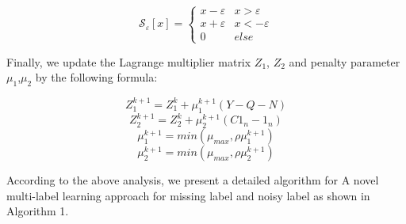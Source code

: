 \documentclass[final,3p,times]{elsarticle}
\begin{document}
\begin{equation}
	\mathcal{S}_{\varepsilon}[x]=
	\begin{cases}
		x-\varepsilon &  x>\varepsilon\\
		x+\varepsilon &  x<-\varepsilon\\
		0 & else
	\end{cases}
\end{equation}


Finally, we update the Lagrange multiplier matrix $Z_1$, $Z_2$ and penalty parameter $\mu_{1}$,$\mu_{2}$ by the following formula:

$$ Z_1^{k+1}=Z_1^{k}+\mu_{1}^{k+1}(Y-Q-N)$$
$$ Z_2^{k+1}=Z_2^{k}+\mu_{2}^{k+1}(C1_n-1_n)$$
$$ \mu_1^{k+1}=min(\mu_{max},\rho\mu_{1}^{k+1})$$
$$ \mu_2^{k+1}=min(\mu_{max},\rho\mu_{2}^{k+1})$$





According to the above analysis, we present a detailed algorithm for A novel multi-label learning approach for missing label and noisy label as shown in Algorithm 1.
\end{document}
